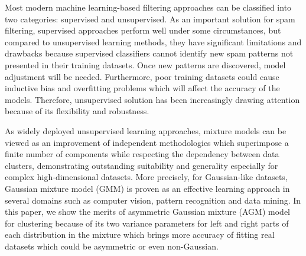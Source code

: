 \documentclass[conference]{IEEEtran}
\begin{document}
Most modern machine learning-based filtering approaches can be classified into two categories: supervised and unsupervised. As an important solution for spam filtering, supervised approaches\cite{Zhang2004} perform well under some circumstances, but compared to unsupervised learning methods, they have significant limitations and drawbacks because supervised classifiers cannot identify new spam patterns not presented in their training datasets. Once new patterns are discovered, model adjustment will be needed. Furthermore, poor training datasets could cause inductive bias and overfitting problems which will affect the accuracy of the models. Therefore, unsupervised solution has been increasingly drawing attention because of its flexibility and robustness.

As widely deployed unsupervised learning approaches, mixture models \cite{Bouguila2011} can be viewed as an improvement of independent methodologies which superimpose a finite number of components while respecting the dependency between data clusters, demonstrating outstanding suitability and generality especially for complex high-dimensional datasets. More precisely, for Gaussian-like datasets, Gaussian mixture model (GMM) \cite{Richardson1997} is proven as an effective   learning approach in several domains such as computer vision, pattern recognition and data mining. In this paper, we show the merits of asymmetric Gaussian mixture (AGM) model \cite{Elguebaly2014} for clustering because of its two variance parameters for left and right parts of each distribution in the mixture which brings more accuracy of fitting real datasets which could be asymmetric or even non-Gaussian. 
\end{document}
